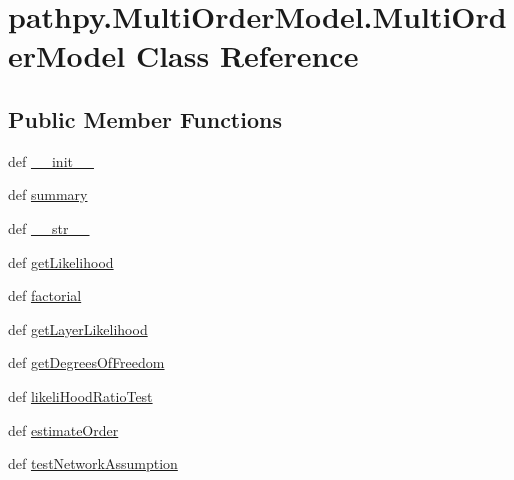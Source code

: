\hypertarget{classpathpy_1_1MultiOrderModel_1_1MultiOrderModel}{\section{pathpy.\-Multi\-Order\-Model.\-Multi\-Order\-Model Class Reference}
\label{classpathpy_1_1MultiOrderModel_1_1MultiOrderModel}
}
\subsection*{Public Member Functions}
\begin{DoxyCompactItemize}
\item 
def \hyperlink{classpathpy_1_1MultiOrderModel_1_1MultiOrderModel_ac8dc89b42d8e51906ce15124da699409}{\-\_\-\-\_\-init\-\_\-\-\_\-}
\item 
def \hyperlink{classpathpy_1_1MultiOrderModel_1_1MultiOrderModel_a58f11a90bea210c70f12eeac3af53d65}{summary}
\item 
def \hyperlink{classpathpy_1_1MultiOrderModel_1_1MultiOrderModel_af69183cc68e6b8aae85cce91341dbf44}{\-\_\-\-\_\-str\-\_\-\-\_\-}
\item 
def \hyperlink{classpathpy_1_1MultiOrderModel_1_1MultiOrderModel_acceb5eabd7d1cb8a8856a485a29fc5f8}{get\-Likelihood}
\item 
def \hyperlink{classpathpy_1_1MultiOrderModel_1_1MultiOrderModel_a7882e4dcbe9ec932e863e20d6b49a4ed}{factorial}
\item 
def \hyperlink{classpathpy_1_1MultiOrderModel_1_1MultiOrderModel_ab56ae5b47770b09178ae5aa49f695d17}{get\-Layer\-Likelihood}
\item 
def \hyperlink{classpathpy_1_1MultiOrderModel_1_1MultiOrderModel_a219e12dca2b474515d74c65c4ad15c69}{get\-Degrees\-Of\-Freedom}
\item 
def \hyperlink{classpathpy_1_1MultiOrderModel_1_1MultiOrderModel_a0518e905c00b8c3a2df5cce509084fb8}{likeli\-Hood\-Ratio\-Test}
\item 
def \hyperlink{classpathpy_1_1MultiOrderModel_1_1MultiOrderModel_a866b2b0b96f4bafa594b2a8d5a64efbf}{estimate\-Order}
\item 
def \hyperlink{classpathpy_1_1MultiOrderModel_1_1MultiOrderModel_aaa9b2f2852c4ae513e5d42a96008c030}{test\-Network\-Assumption}
\end{DoxyCompactItemize}
